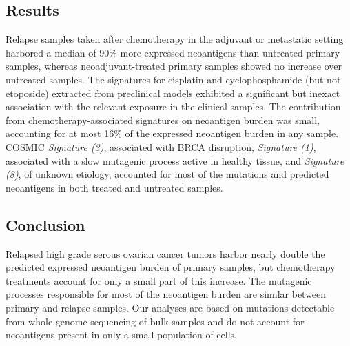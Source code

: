 \subsection*{Results}
Relapse samples taken after chemotherapy in the adjuvant or metastatic setting harbored a median of 90\% more expressed neoantigens than untreated primary samples, whereas neoadjuvant-treated primary samples showed no increase over untreated samples. The signatures for cisplatin and cyclophosphamide (but not etoposide) extracted from preclinical models exhibited a significant but inexact association with the relevant exposure in the clinical samples. The contribution from chemotherapy-associated signatures on neoantigen burden was small, accounting for at most 16\% of the expressed neoantigen burden in any sample. COSMIC \textit{Signature (3)}, associated with BRCA disruption, \textit{Signature (1)}, associated with a slow mutagenic process active in healthy tissue, and \textit{Signature (8)}, of unknown etiology, accounted for most of the mutations and predicted neoantigens in both treated and untreated samples. 

\subsection*{Conclusion}
Relapsed high grade serous ovarian cancer tumors harbor nearly double the predicted expressed neoantigen burden of primary samples, but chemotherapy treatments account for only a small part of this increase. The mutagenic processes responsible for most of the neoantigen burden are similar between primary and relapse samples. Our analyses are based on mutations detectable from whole genome sequencing of bulk samples and do not account for neoantigens present in only a small population of cells. 



